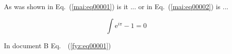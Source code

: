 \documentclass{scrbook}
\begin{document}
  \frontmatter
    
    \tableofcontents
  \mainmatter 
    \setcounter{page}{3} 

    As was shown in Eq.~(\ref{mai:eq00001}) is it
    ... or in Eq.~(\ref{mai:eq00002}) is ...

    \begin{equation}
      \int\mathrm{e}^{i\pi}-1=0 \label{tky:eq00001}
    \end{equation}

    In document B Eq.~~(\ref{fyz:eq00001}) 

    
  \backmatter
\end{document}
